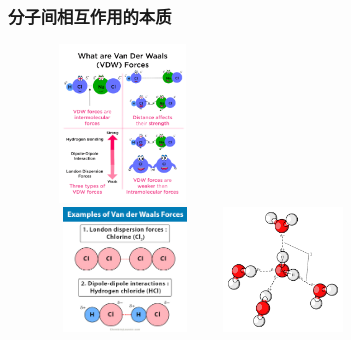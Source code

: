 \frame
{
	\frametitle{分子间相互作用的本质}
\begin{figure}[h!]
\centering
\vspace{-10.5pt}
\includegraphics[height=1.65in ,width=1.55in,viewport=0 0 1150 1280,clip]{Figures/van_der_Waals-Force.png}\\
\includegraphics[height=1.30in,width=1.60in,viewport=0 25 600 530,clip]{Figures/Van-Der-Waals-Forces-Bond-Interactions-Examples.jpg}
\includegraphics[height=1.30in,width=1.60in,viewport=0 0 280 230,clip]{Figures/water-H-bond.png}
\label{van_der_Waalss}
\end{figure}
}

